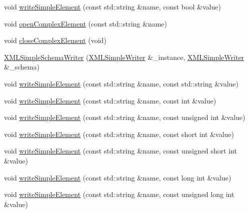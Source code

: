 \begin{DoxyCompactItemize}
\item 
void \mbox{\hyperlink{classXMLWriterAPI_1_1XMLSimpleSchemaWriter_aecd8faa2f1b2411dc108007c05bdb339}{write\+Simple\+Element}} (const std\+::string \&name, const bool \&value)
\item 
void \mbox{\hyperlink{classXMLWriterAPI_1_1XMLSimpleSchemaWriter_a136a57c1860b0baa0fd6b877f4dce4bc}{open\+Complex\+Element}} (const std\+::string \&name)
\item 
void \mbox{\hyperlink{classXMLWriterAPI_1_1XMLSimpleSchemaWriter_a48be6d4cbc08f03e9e76fa94107c4b8a}{close\+Complex\+Element}} (void)
\item 
\mbox{\hyperlink{classXMLWriterAPI_1_1XMLSimpleSchemaWriter_a309425b6927188991ba8fb9d19e0caca}{X\+M\+L\+Simple\+Schema\+Writer}} (\mbox{\hyperlink{classXMLWriterAPI_1_1XMLSimpleWriter}{X\+M\+L\+Simple\+Writer}} \&\+\_\+instance, \mbox{\hyperlink{classXMLWriterAPI_1_1XMLSimpleWriter}{X\+M\+L\+Simple\+Writer}} \&\+\_\+schema)
\item 
void \mbox{\hyperlink{classXMLWriterAPI_1_1XMLSimpleSchemaWriter_a312669330ac26b8849f671ea23ea60de}{write\+Simple\+Element}} (const std\+::string \&name, const std\+::string \&value)
\item 
void \mbox{\hyperlink{classXMLWriterAPI_1_1XMLSimpleSchemaWriter_a40db83e5cfb496535b89dae68eeea314}{write\+Simple\+Element}} (const std\+::string \&name, const int \&value)
\item 
void \mbox{\hyperlink{classXMLWriterAPI_1_1XMLSimpleSchemaWriter_a378d9bf2c78118d6a8e1bc934f96ef1d}{write\+Simple\+Element}} (const std\+::string \&name, const unsigned int \&value)
\item 
void \mbox{\hyperlink{classXMLWriterAPI_1_1XMLSimpleSchemaWriter_a915b7adc844a85019793c873e2184298}{write\+Simple\+Element}} (const std\+::string \&name, const short int \&value)
\item 
void \mbox{\hyperlink{classXMLWriterAPI_1_1XMLSimpleSchemaWriter_a9fe3e03577fa580736944c58c2019d6b}{write\+Simple\+Element}} (const std\+::string \&name, const unsigned short int \&value)
\item 
void \mbox{\hyperlink{classXMLWriterAPI_1_1XMLSimpleSchemaWriter_a96700920c4929deb5e7093188b187402}{write\+Simple\+Element}} (const std\+::string \&name, const long int \&value)
\item 
void \mbox{\hyperlink{classXMLWriterAPI_1_1XMLSimpleSchemaWriter_a1c74f3c8d41ca4e660f119580de9202e}{write\+Simple\+Element}} (const std\+::string \&name, const unsigned long int \&value)
\item 

\end{DoxyCompactItemize}
